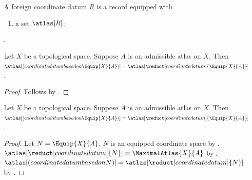 

\begin{struct}\label{foreign_coordinate_datum}
    A foreign coordinate datum $R$ is a record equipped with
    \begin{enumerate}
        \item a set $\atlas[R]$;
    \end{enumerate}.
\end{struct}

\begin{proposition}\label{reconstruction_disambiguates_projection}
    Let $X$ be a topological space.
    Suppose $A$ is an admissible atlas on $X$.
    Then $\atlas[(coordinate datum based on \Equip{X}{A})]=
        \atlas[\reduct[coordinate datum]{\Equip{X}{A}}]$.
\end{proposition}
\begin{proof}
    Follows by .
\end{proof}

\begin{proposition}\label{alias_disambiguates_projection}
    Let $X$ be a topological space.
    Suppose $A$ is an admissible atlas on $X$.
    Then $\atlas[(coordinate datum based on \Equip{X}{A})]=
        \atlas[\reduct[coordinate datum]{\Equip{X}{A}}]$.
\end{proposition}
\begin{proof}
    Let $N=\Equip{X}{A}$.
    $N$ is an equipped coordinate space by .
    $\atlas[\reduct[coordinate datum]{N}]=\MaximalAtlas{X}{A}$
        by .
    $\atlas[(coordinate datum based on N)]=\atlas[\reduct[coordinate datum]{N}]$
        by .
\end{proof}
